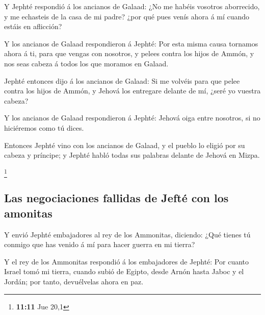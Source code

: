  Y Jephté respondió á los ancianos de Galaad: ¿No me habéis
vosotros aborrecido, y me echasteis de la casa de mi padre? ¿por qué
pues venís ahora á mí cuando estáis en aflicción?

 Y los ancianos de Galaad respondieron á Jephté: Por esta
misma causa tornamos ahora á ti, para que vengas con nosotros, y pelees
contra los hijos de Ammón, y nos seas cabeza á todos los que moramos en
Galaad.

 Jephté entonces dijo á los ancianos de Galaad: Si me
volvéis para que pelee contra los hijos de Ammón, y Jehová los entregare
delante de mí, ¿seré yo vuestra cabeza?

 Y los ancianos de Galaad respondieron á Jephté: Jehová
oiga entre nosotros, si no hiciéremos como tú dices.

 Entonces Jephté vino con los ancianos de Galaad, y el
pueblo lo eligió por su cabeza y príncipe; y Jephté habló todas sus
palabras delante de Jehová en Mizpa.

\footnote{\textbf{11:11} Jue 20,1}

\hypertarget{las-negociaciones-fallidas-de-jeftuxe9-con-los-amonitas}{%
\subsection{Las negociaciones fallidas de Jefté con los
amonitas}\label{las-negociaciones-fallidas-de-jeftuxe9-con-los-amonitas}}

 Y envió Jephté embajadores al rey de los Ammonitas,
diciendo: ¿Qué tienes tú conmigo que has venido á mí para hacer guerra
en mi tierra?

 Y el rey de los Ammonitas respondió á los embajadores de
Jephté: Por cuanto Israel tomó mi tierra, cuando subió de Egipto, desde
Arnón hasta Jaboc y el Jordán; por tanto, devuélvelas ahora en paz.

